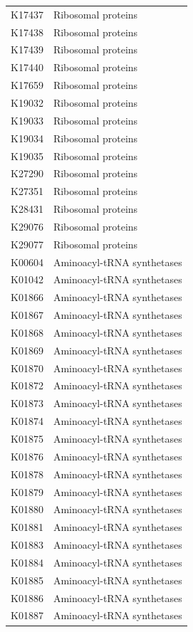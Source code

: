 \begin{longtable}{@{}l l@{}}
K17437 & Ribosomal proteins \\
K17438 & Ribosomal proteins \\
K17439 & Ribosomal proteins \\
K17440 & Ribosomal proteins \\
K17659 & Ribosomal proteins \\
K19032 & Ribosomal proteins \\
K19033 & Ribosomal proteins \\
K19034 & Ribosomal proteins \\
K19035 & Ribosomal proteins \\
K27290 & Ribosomal proteins \\
K27351 & Ribosomal proteins \\
K28431 & Ribosomal proteins \\
K29076 & Ribosomal proteins \\
K29077 & Ribosomal proteins \\
K00604 & Aminoacyl-tRNA synthetases \\
K01042 & Aminoacyl-tRNA synthetases \\
K01866 & Aminoacyl-tRNA synthetases \\
K01867 & Aminoacyl-tRNA synthetases \\
K01868 & Aminoacyl-tRNA synthetases \\
K01869 & Aminoacyl-tRNA synthetases \\
K01870 & Aminoacyl-tRNA synthetases \\
K01872 & Aminoacyl-tRNA synthetases \\
K01873 & Aminoacyl-tRNA synthetases \\
K01874 & Aminoacyl-tRNA synthetases \\
K01875 & Aminoacyl-tRNA synthetases \\
K01876 & Aminoacyl-tRNA synthetases \\
K01878 & Aminoacyl-tRNA synthetases \\
K01879 & Aminoacyl-tRNA synthetases \\
K01880 & Aminoacyl-tRNA synthetases \\
K01881 & Aminoacyl-tRNA synthetases \\
K01883 & Aminoacyl-tRNA synthetases \\
K01884 & Aminoacyl-tRNA synthetases \\
K01885 & Aminoacyl-tRNA synthetases \\
K01886 & Aminoacyl-tRNA synthetases \\
K01887 & Aminoacyl-tRNA synthetases \\

\end{longtable}
